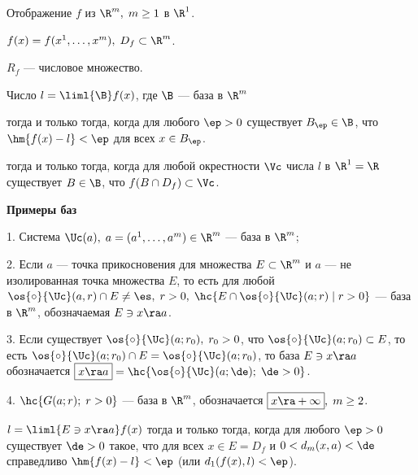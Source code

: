 \documentclass[a4paper]{article}
\begin{document}
Отображение $f$ из $\R^m, \; m\ge 1$ в $\R^1$.

$f(x)=f(x^1,\ldots,x^m), \; D_f\subset\R^m$.

$R_f$ --- числовое множество.

\begin{df}
Число $l=\liml{\B} f(x)$, где $\B$ --- база в $\R^m$
\par\noindent тогда и только тогда, когда для любого $\ep>0$ существует $B_{\ep}\in\B$, что
$\hm{f(x)-l}<\ep$ для всех $x\in B_{\ep}$. \par\noindent тогда и
только тогда, когда для любой окрестности $\Vc$ числа $l$ в
$\R^1=\R$ существует $B\in\B$, что $f(B\cap D_f)\subset\Vc$.
\end{df}

\textbf{Примеры баз}

1. Система $\Uc(a),\; a=(a^1,\ldots,a^m)\in\R^m$ --- база в $\R^m$;

2. Если $a$ --- точка прикосновения для множества $E\subset\R^m$ и
$a$ --- не изолированная точка множества $E$, то есть для любой
$\os{\circ}{\Uc}(a,r)\cap E \ne \es, \; r>0, \; \hc{ E \cap \os{\circ}{\Uc} (a;r) \; | \; r>0 }$ --- база в $\R^m$, обозначаемая
$E\owns x\ra a$.

3. Если существует $\os{\circ}{\Uc}(a;r_0), \;r_0>0$, что
$\os{\circ}{\Uc}(a;r_0) \subset E$, то есть $\os{\circ}{\Uc}(a;r_0)
\cap E = \os{\circ}{\Uc} (a;r_0)$, то база $E\owns x\ra a$
обозначается $\boxed{x\ra a} = \hc{ \os{\circ}{\Uc} (a;\de); \;
\de>0}$.

4. $\hc{G(a;r); \; r>0}$ --- база в $\R^m$, обозначается
$\boxed{x\ra+\infty},\;m\ge2$. %

$l=\liml{E\owns x\ra a} f(x)$ тогда и только тогда, когда для
любого $\ep>0$ существует $\de>0$ такое, что для всех $x\in E = D_f$
и $0<d_m(x,a)<\de$ справедливо $\hm{f(x)-l}<\ep$ (или
$d_1(f(x),l)<\ep$).
\end{document}
